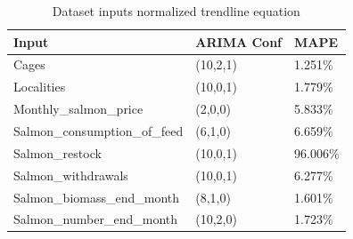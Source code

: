 \begin{table}[ht] 
	\centering
    \begin{tabular}{ | l | l | l |}
            \hline
Input							&	ARIMA Conf	&	MAPE	\\ \hline
Cages							&	(10,2,1)	&	1.251\%	\\ \hline
Localities						&	(10,0,1)	&	1.779\%	\\ \hline
Monthly\_salmon\_price 			&	(2,0,0)		&	5.833\%	\\ \hline
Salmon\_consumption\_of\_feed	&	(6,1,0)		&	6.659\%	\\ \hline
Salmon\_restock 				&	(10,0,1)	&	96.006\%	\\ \hline
Salmon\_withdrawals 			&	(10,0,1)	&	6.277\%	\\ \hline
Salmon\_biomass\_end\_month		&	(8,1,0)		&	1.601\%	\\ \hline
Salmon\_number\_end\_month 		&	(10,2,0)	&	1.723\%	\\ \hline
    \end{tabular} 
    \caption{Dataset inputs normalized trendline equation}
    \label{table: Best ARIMA configurations with relative MAPE result in the Evaluation Test} 
\end{table}



